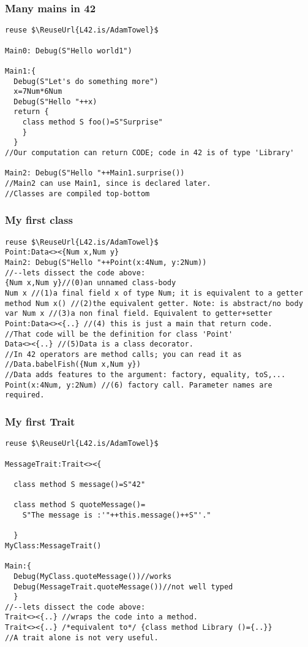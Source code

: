 \begin{frame}[fragile]
\frametitle{Many mains in 42}
\begin{NiceCode}{59ex}{0.8}
\begin{lstlisting}
reuse $\ReuseUrl{L42.is/AdamTowel}$

Main0: Debug(S"Hello world1")

Main1:{
  Debug(S"Let's do something more")  
  x=7Num*6Num
  Debug(S"Hello "++x)
  return {
    class method S foo()=S"Surprise"
    }
  }
//Our computation can return CODE; code in 42 is of type 'Library'

Main2: Debug(S"Hello "++Main1.surprise())
//Main2 can use Main1, since is declared later.
//Classes are compiled top-bottom
\end{lstlisting}
\end{NiceCode}
\end{frame}

\begin{frame}[fragile]
\frametitle{My first class}
\begin{NiceCode}{59ex}{0.8}
\begin{lstlisting}
reuse $\ReuseUrl{L42.is/AdamTowel}$
Point:Data<><{Num x,Num y}
Main2: Debug(S"Hello "++Point(x:4Num, y:2Num))
//--lets dissect the code above:
{Num x,Num y}//(0)an unnamed class-body
Num x //(1)a final field x of type Num; it is equivalent to a getter
method Num x() //(2)the equivalent getter. Note: is abstract/no body
var Num x //(3)a non final field. Equivalent to getter+setter
Point:Data<><{..} //(4) this is just a main that return code.
//That code will be the definition for class 'Point'
Data<><{..} //(5)Data is a class decorator.
//In 42 operators are method calls; you can read it as 
//Data.babelFish({Num x,Num y})
//Data adds features to the argument: factory, equality, toS,...
Point(x:4Num, y:2Num) //(6) factory call. Parameter names are required.
\end{lstlisting}
\end{NiceCode}
\end{frame}

\begin{frame}[fragile]
\frametitle{My first Trait}
\begin{NiceCode}{59ex}{0.8}
\begin{lstlisting}
reuse $\ReuseUrl{L42.is/AdamTowel}$

MessageTrait:Trait<><{

  class method S message()=S"42"

  class method S quoteMessage()=
    S"The message is :'"++this.message()++S"'."

  }
MyClass:MessageTrait()

Main:{
  Debug(MyClass.quoteMessage())//works
  Debug(MessageTrait.quoteMessage())//not well typed
  }
//--lets dissect the code above:
Trait<><{..} //wraps the code into a method.
Trait<><{..} /*equivalent to*/ {class method Library ()={..}}
//A trait alone is not very useful.
\end{lstlisting}
\end{NiceCode}
\end{frame}


